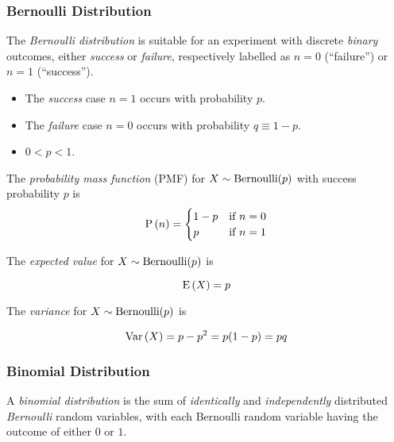 \subsubsection{Bernoulli Distribution}

\begin{definition}
    The \textit{Bernoulli distribution} is suitable for an experiment with discrete \textit{binary} outcomes, either \textit{success} or \textit{failure}, respectively labelled as $n = 0$ (\enquote{failure}) or $n = 1$ (\enquote{success}).
    
    \begin{itemize}
        \item The \textit{success} case $n = 1$ occurs with probability $p$.
        \item The \textit{failure} case $n = 0$ occurs with probability $q \equiv 1 - p$.
        \item $0 < p < 1$.
    \end{itemize}
    
    The \textit{probability mass function} (PMF) for $X \sim \mathrm{Bernoulli}(p)$ with success probability $p$ is
    \begin{equation}
        \mathrm{P} \left( n \right) =
        \begin{cases}
            1 - p & \text{if $n = 0$} \\
            p & \text{if $n = 1$} \\
        \end{cases}
    \end{equation}
    
    The \textit{expected value} for $X \sim \mathrm{Bernoulli}(p)$ is
    
    \begin{equation}
        \mathrm{E} \left( X \right) = p
    \end{equation}
    
    The \textit{variance} for $X \sim \mathrm{Bernoulli}(p)$ is
    
    \begin{equation}
        \mathrm{Var} \left( X \right) = p - p^2 = p(1 - p) = pq
    \end{equation}
\end{definition}

\subsubsection{Binomial Distribution}

\begin{remark}
    A \textit{binomial distribution} is the sum of \textit{identically} and \textit{independently} distributed \textit{Bernoulli} random variables, with each Bernoulli random variable having the outcome of either $0$ or $1$.
\end{remark}

